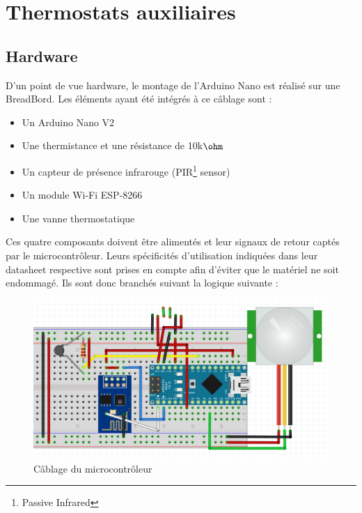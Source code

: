 \documentclass[11pt,a4paper,11pt]{report}
\begin{document}
\newpage

\chapter{Thermostats auxiliaires}

\section{Hardware}

D’un point de vue hardware, le montage de l’Arduino Nano est réalisé sur une BreadBord. Les éléments ayant été intégrés à ce câblage sont :\newline
\begin{itemize}
	\item Un Arduino Nano V2 \cite{ar1} \newline
    \item Une thermistance et une résistance de 10k$\ohm$ \cite{datash} \newline
	\item Un capteur de présence infrarouge (PIR\footnote{Passive Infrared} sensor) \cite{ar3} \newline
	\item Un module Wi-Fi ESP-8266 \cite{ar4} \newline
	\item Une vanne thermostatique \newline
\end{itemize}

Ces quatre composants doivent être alimentés et leur signaux de retour captés par le microcontrôleur. Leurs spécificités d’utilisation indiquées dans leur datasheet respective sont prises en compte afin d’éviter que le matériel ne soit endommagé. Ils sont donc branchés suivant la logique suivante :\\

\begin{figure}[h]
 \begin{center}
  \includegraphics[width=0.6\linewidth]{images/cablage.png}
  \caption{Câblage du microcontrôleur}
  \label{arduino_cablage}
 \end{center}
\end{figure}
\end{document}

